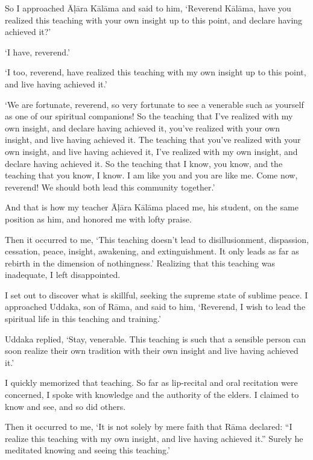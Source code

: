 \documentclass[12pt,openany]{book}%
\begin{document}
So I approached \textsanskrit{Āḷāra} \textsanskrit{Kālāma} and said to him, ‘Reverend \textsanskrit{Kālāma}, have you realized this teaching with your own insight up to this point, and declare having achieved it?’ 

‘I have, reverend.’ 

‘I too, reverend, have realized this teaching with my own insight up to this point, and live having achieved it.’ 

‘We are fortunate, reverend, so very fortunate to see a venerable such as yourself as one of our spiritual companions! So the teaching that I’ve realized with my own insight, and declare having achieved it, you’ve realized with your own insight, and live having achieved it. The teaching that you’ve realized with your own insight, and live having achieved it, I’ve realized with my own insight, and declare having achieved it. So the teaching that I know, you know, and the teaching that you know, I know. I am like you and you are like me. Come now, reverend! We should both lead this community together.’ 

And that is how my teacher \textsanskrit{Āḷāra} \textsanskrit{Kālāma} placed me, his student, on the same position as him, and honored me with lofty praise. 

Then it occurred to me, ‘This teaching doesn’t lead to disillusionment, dispassion, cessation, peace, insight, awakening, and extinguishment. It only leads as far as rebirth in the dimension of nothingness.’ Realizing that this teaching was inadequate, I left disappointed. 

I set out to discover what is skillful, seeking the supreme state of sublime peace. I approached Uddaka, son of \textsanskrit{Rāma}, and said to him, ‘Reverend, I wish to lead the spiritual life in this teaching and training.’ 

Uddaka replied, ‘Stay, venerable. This teaching is such that a sensible person can soon realize their own tradition with their own insight and live having achieved it.’ 

I quickly memorized that teaching. So far as lip-recital and oral recitation were concerned, I spoke with knowledge and the authority of the elders. I claimed to know and see, and so did others. 

Then it occurred to me, ‘It is not solely by mere faith that \textsanskrit{Rāma} declared: “I realize this teaching with my own insight, and live having achieved it.” Surely he meditated knowing and seeing this teaching.’ 
\end{document}

